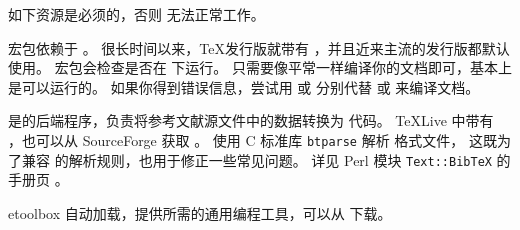 
如下资源是必须的，否则 \biblatex 无法正常工作。

\begin{marglist}

\item[\eTeX]
\biblatex 宏包依赖于 \eTeX 。
很长时间以来，\TeX 发行版就带有 \eTeX ，并且近来主流的发行版都默认使用。
\biblatex 宏包会检查是否在 \eTeX 下运行。
只需要像平常一样编译你的文档即可，基本上是可以运行的。
如果你得到错误信息，尝试用  或  分别代替  或  来编译文档。

\item[\biber]
\biber 是\biblatex 的后端程序，负责将参考文献源文件中的数据转换为 \latex 代码。
\TeX Live 中带有 \biber ，也可以从 SourceForge 获取  。
\biber 使用 C 标准库 \texttt{btparse} 解析 \BibTeX 格式文件，
这既为了兼容 \BibTeX 的解析规则，也用于修正一些常见问题。
详见 Perl 模块 \texttt{Text::BibTeX} 的手册页 。

\item[etoolbox]
自动加载，提供\biblatex 所需的通用编程工具，可以从  下载。


\end{marglist}
